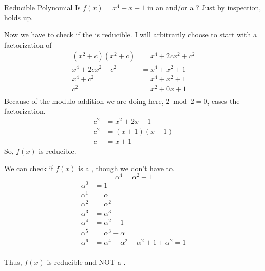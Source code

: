 \begin{example}{Reducible Polynomial}
  Is $f(x) = x^{4} + x + 1$ in  an   and/or a ?
  \tcblower{}
  Just by inspection,  holds up.

  Now we have to check if the  is reducible.
  I will arbitrarily choose to start with a factorization of
  \begin{align*}
    \left( x^{2} + c \right) \left( x^{2} + c \right) &= x^{4} + 2cx^{2} + c^{2} \\
    x^{4} + 2cx^{2} + c^{2} &= x^{4} + x^{2} + 1 \\
    x^{4} + c^{2} &= x^{4} + x^{2} + 1 \\
    c^{2} &= x^{2} + 0x + 1 \\
  \end{align*}
  Because of the modulo addition we are doing here, $2 \bmod 2 = 0$, eases the factorization.
  \begin{align*}
    c^{2} &= x^{2} + 2x + 1 \\
    c^{2} &= (x + 1) (x + 1) \\
    c &= x+1
  \end{align*}
  So, $f(x)$ is reducible.

  We can check if $f(x)$ is a , though we don't have to.
  \begin{equation*}
    \alpha^{4} = \alpha^{2} + 1
  \end{equation*}
  \begin{align*}
    \alpha^{0} &= 1 \\
    \alpha^{1} &= \alpha \\
    \alpha^{2} &= \alpha^{2} \\
    \alpha^{3} &= \alpha^{3} \\
    \alpha^{4} &= \alpha^{2} + 1 \\
    \alpha^{5} &= \alpha^{3} + \alpha \\
    \alpha^{6} &= \alpha^{4} + \alpha^{2} + \alpha^{2} + 1 + \alpha^{2} = 1 \\
  \end{align*}

  Thus, $f(x)$ is reducible and NOT a .
\end{example}

